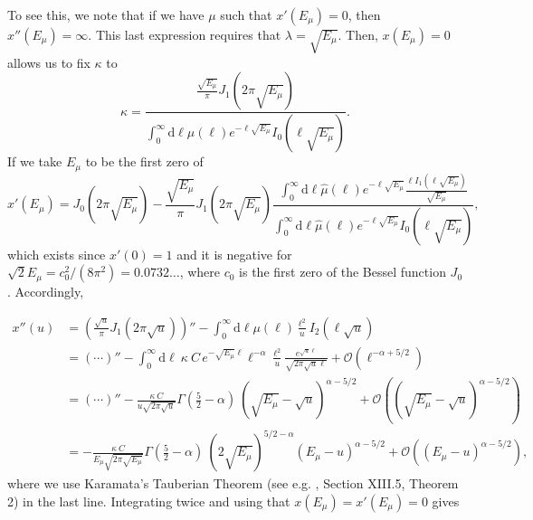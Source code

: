 \documentclass[a4paper,11pt]{article}
\newcommand{\rmd}{\mathrm{d}}
\begin{document}
To see this, we note that if we have $\mu$ such that $x'(E_\mu)=0$, then  $x''(E_\mu)=\infty$. This last expression requires that $\lambda = \sqrt{E_\mu}$.
Then, $x(E_\mu)=0$ allows us to fix $\kappa$ to
\begin{equation}
    \kappa = \frac{\frac{\sqrt{E_\mu}}{\pi} J_1(2\pi\sqrt{E_\mu})}{\int_0^\infty \rmd \ell \hat{\mu}(\ell) e^{-\ell\sqrt{E_\mu}}I_0(\ell \sqrt{E_\mu})}.\label{eq:kappa}
\end{equation}
If we take $E_\mu$ to be the first zero of
\begin{equation}
    x'(E_\mu) = J_0(2\pi\sqrt{E_\mu}) - \frac{\sqrt{E_\mu}}{\pi} J_1(2\pi\sqrt{E_\mu}) \frac{\int_0^\infty \rmd \ell \hat{\mu}(\ell) e^{-\ell\sqrt{E_\mu}}\frac{\ell I_1(\ell \sqrt{E_\mu})}{\sqrt{E_\mu}}}{\int_0^\infty \rmd \ell \hat{\mu}(\ell) e^{-\ell\sqrt{E_\mu}}I_0(\ell \sqrt{E_\mu})},
\end{equation}
which exists since $x'(0)=1$ and it is negative for $\sqrt{2}E_\mu = c_0^2/(8\pi^2) = 0.0732\ldots$, where $c_0$ is the first zero of the Bessel function $J_0$.
Accordingly,

\begin{align}
    x''(u) &= \left(\frac{\sqrt{u}}{\pi}J_1\left(2\pi\sqrt{u}\right)\right)'' - \int_0^\infty \rmd \ell \mu(\ell) \frac{\ell^2}{u}I_2(\ell\sqrt{u})\\
    &= (\cdots)''-\int_0^\infty \rmd \ell \ \kappa \ C \,e^{-\sqrt{E_\mu}\ell} \ell^{-\alpha} \frac{\ell^2}{u}\frac{e^{\sqrt{u}\ell}}{\sqrt{2\pi\sqrt{u}\ell}}+\mathcal{O}(\ell^{-\alpha+5/2})\\
    &= (\cdots)''-\frac{\kappa \ C}{u\sqrt{2\pi\sqrt{u}}} \Gamma\left(\frac{5}{2}-\alpha\right)\ (\sqrt{E_\mu}-\sqrt{u})^{\alpha - 5/2} + \mathcal{O}((\sqrt{E_\mu}-\sqrt{u})^{\alpha - 5/2})\\
    &= -\frac{\kappa \ C}{E_\mu \sqrt{2\pi\sqrt{E_\mu}}} \Gamma\left(\frac{5}{2}-\alpha\right)\ (2\sqrt{E_\mu})^{5/2-\alpha}(E_\mu-u)^{\alpha - 5/2} + \mathcal{O}((E_\mu-u)^{\alpha - 5/2}),
\end{align}
where we use Karamata's Tauberian Theorem (see e.g. \cite{feller-vol-2}, Section XIII.5, Theorem 2) in the last line. Integrating twice and using that $x(E_\mu)=x'(E_\mu)=0$ gives
\end{document}
